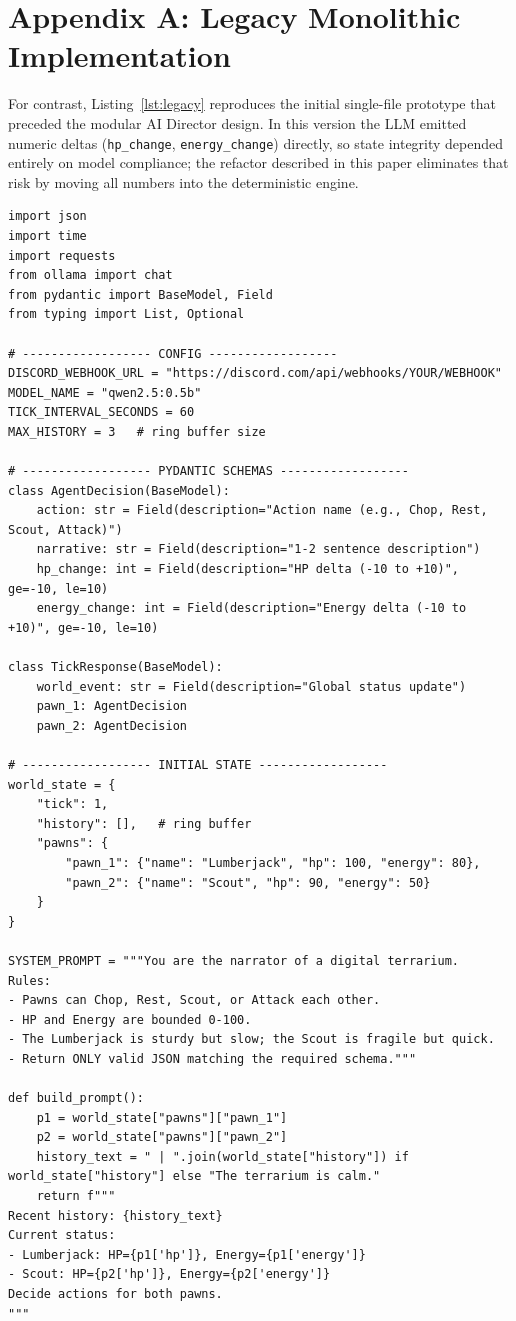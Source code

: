 \documentclass[10pt,a4paper]{article}
\begin{document}
\appendix
\section{Appendix A: Legacy Monolithic Implementation}
For contrast, Listing~\ref{lst:legacy} reproduces the initial single-file prototype that preceded the modular AI Director design. In this version the LLM emitted numeric deltas (\texttt{hp\_change}, \texttt{energy\_change}) directly, so state integrity depended entirely on model compliance; the refactor described in this paper eliminates that risk by moving all numbers into the deterministic engine.

\begin{lstlisting}[style=python, caption={Legacy Monolithic Loop (superseded --- LLM emitted \texttt{hp\_change}, \texttt{energy\_change} deltas directly)}, label={lst:legacy}]
import json
import time
import requests
from ollama import chat
from pydantic import BaseModel, Field
from typing import List, Optional

# ------------------ CONFIG ------------------
DISCORD_WEBHOOK_URL = "https://discord.com/api/webhooks/YOUR/WEBHOOK"
MODEL_NAME = "qwen2.5:0.5b"
TICK_INTERVAL_SECONDS = 60
MAX_HISTORY = 3   # ring buffer size

# ------------------ PYDANTIC SCHEMAS ------------------
class AgentDecision(BaseModel):
    action: str = Field(description="Action name (e.g., Chop, Rest, Scout, Attack)")
    narrative: str = Field(description="1-2 sentence description")
    hp_change: int = Field(description="HP delta (-10 to +10)", ge=-10, le=10)
    energy_change: int = Field(description="Energy delta (-10 to +10)", ge=-10, le=10)

class TickResponse(BaseModel):
    world_event: str = Field(description="Global status update")
    pawn_1: AgentDecision
    pawn_2: AgentDecision

# ------------------ INITIAL STATE ------------------
world_state = {
    "tick": 1,
    "history": [],   # ring buffer
    "pawns": {
        "pawn_1": {"name": "Lumberjack", "hp": 100, "energy": 80},
        "pawn_2": {"name": "Scout", "hp": 90, "energy": 50}
    }
}

SYSTEM_PROMPT = """You are the narrator of a digital terrarium.
Rules:
- Pawns can Chop, Rest, Scout, or Attack each other.
- HP and Energy are bounded 0-100.
- The Lumberjack is sturdy but slow; the Scout is fragile but quick.
- Return ONLY valid JSON matching the required schema."""

def build_prompt():
    p1 = world_state["pawns"]["pawn_1"]
    p2 = world_state["pawns"]["pawn_2"]
    history_text = " | ".join(world_state["history"]) if world_state["history"] else "The terrarium is calm."
    return f"""
Recent history: {history_text}
Current status:
- Lumberjack: HP={p1['hp']}, Energy={p1['energy']}
- Scout: HP={p2['hp']}, Energy={p2['energy']}
Decide actions for both pawns.
"""


\end{lstlisting}
\end{document}
